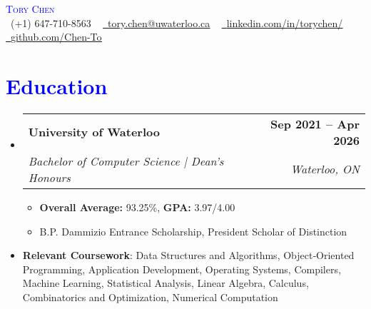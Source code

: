 \documentclass[letterpaper,11pt]{article}
\makeatletter
\newcommand{\resumeItem}[1]{
  \item\small{
    {#1 \vspace{-2pt}}
  }
}
\newcommand{\resumeSubheading}[4]{
  \vspace{-2pt}\item
    \begin{tabular*}{1.0\textwidth}[t]{l@{\extracolsep{\fill}}r}
      \textbf{#1} & \textbf{\small #2} \\
      \textit{\small#3} & \textit{\small #4} \\
    \end{tabular*}\vspace{-7pt}
}
\newcommand{\resumeSubItem}[1]{\resumeItem{#1}\vspace{-4pt}}
\newcommand{\resumeSubHeadingListStart}{\begin{itemize}[leftmargin=0.0in, label={}]}
\newcommand{\resumeSubHeadingListEnd}{\end{itemize}}
\makeatother
\begin{document}
\begin{center}
    \textcolor{Blue}{\Huge \scshape Tory Chen} \\ \vspace{1pt}
    \small \raisebox{-0.1\height}\faPhone\ (+1) 647-710-8563 ~ \href{mailto:tory.chen@uwaterloo.ca}{\raisebox{-0.2\height}\faEnvelope\  \underline{tory.chen@uwaterloo.ca}} ~ 
    \href{https://www.linkedin.com/in/torychen/}{\raisebox{-0.2\height}\faLinkedin\ \underline{linkedin.com/in/torychen/}}  ~
    \href{https://github.com/Chen-To}{\raisebox{-0.2\height}\faGithub\ 
    \underline{github.com/Chen-To}}
    \vspace{-8pt}
\end{center}

\section{\textcolor{Blue}{Education}}
  \resumeSubHeadingListStart
    \resumeSubheading
          {\textcolor{NavyBlue}{University of Waterloo}}{Sep 2021 -- Apr 2026}
      {Bachelor of Computer Science | Dean's Honours}{Waterloo, ON}
      \begin{itemize}
        \item\small \textbf{Overall Average:} 93.25\%, \textbf{GPA:} 3.97/4.00
        \item\small B.P. Dammizio Entrance Scholarship, President Scholar of Distinction
      \end{itemize}
      \vspace{0.4pt}
  \resumeSubItem{}
    \textbf{\textcolor{NavyBlue}{Relevant Coursework}}{: Data Structures and Algorithms, Object‐Oriented Programming, Application Development, Operating Systems, Compilers, Machine Learning, Statistical Analysis, Linear Algebra, Calculus, Combinatorics and Optimization, Numerical Computation} 
    \vspace{3pt}
  \resumeSubHeadingListEnd
  \vspace{-16pt}
\end{document}
